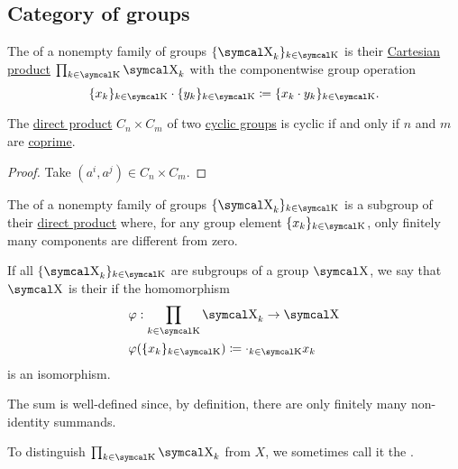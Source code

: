 \subsection{Category of groups}\label{subsec:groups}

\begin{definition}\label{def:group_direct_product}
  The  of a nonempty family of groups \( \{ \CX_k \}_{k \in \CK} \) is their \hyperref[def:cartesian_product]{Cartesian product} \( \prod_{k \in \CK} \CX_k \) with the componentwise group operation
  \begin{equation*}
    \{ x_k \}_{k \in \CK} \cdot \{ y_k \}_{k \in \CK}
    \coloneqq
    \{ x_k \cdot y_k \}_{k \in \CK}.
  \end{equation*}
\end{definition}

\begin{proposition}\label{thm:product_of_cyclic_groups}
  The \hyperref[def:group_direct_product]{direct product} \( C_n \times C_m \) of two \hyperref[def:cyclic_group]{cyclic groups} is cyclic if and only if \( n \) and \( m \) are \hyperref[def:coprime_numbers]{coprime}.
\end{proposition}
\begin{proof}
  Take \( (a^i, a^j) \in C_n \times C_m \).
\end{proof}

\begin{definition}\label{def:group_direct_sum}
  The  of a nonempty family of groups \( \{ \CX_k \}_{k \in \CK} \) is a subgroup of their \hyperref[def:group_direct_sum]{direct product} where, for any group element \( \{ x_k \}_{k \in \CK} \), only finitely many components are different from zero.

  \begin{DefEnum}
    If all \( \{ \CX_k \}_{k \in \CK} \) are subgroups of a group \( \CX \), we say that \( \CX \) is their  if the homomorphism
    \begin{align*}
       &\varphi: \prod_{k \in \CK} \CX_k \to \CX \\
       &\varphi(\{ x_k \}_{k \in \CK}) \coloneqq \cdot_{k \in \CK} x_k
    \end{align*}
    is an isomorphism.

    The sum is well-defined since, by definition, there are only finitely many non-identity summands.

     To distinguish \( \prod_{k \in \CK} \CX_k \) from \( X \), we sometimes call it the .
  \end{DefEnum}
\end{definition}

